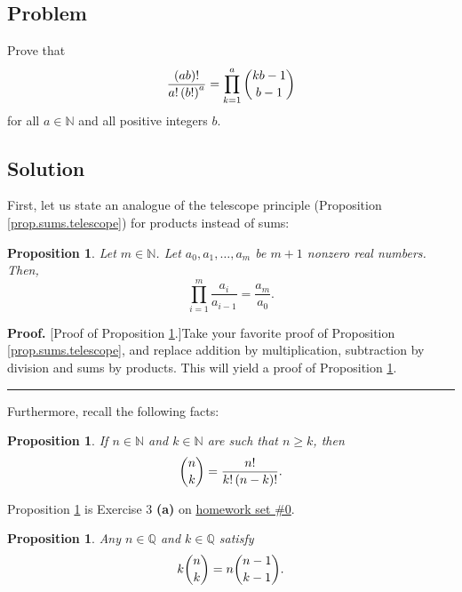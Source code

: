 \documentclass[paper=a4, fontsize=12pt]{scrartcl}%
\let\prodnonlimits\prod
\renewcommand{\prod}{\prodnonlimits\limits}
\theoremstyle{plainsl}
\newtheorem{proposition}[theorem]{Proposition}
\theoremstyle{definition}
\theoremstyle{remark}
\newenvironment{proof}[1][Proof]{\noindent\textbf{#1.} }{\ \rule{0.5em}{0.5em}}
\begin{document}
\subsection{Problem}

Prove that
\[
\dfrac{\left(  ab \right)  !}{a! \left(  b! \right)  ^{a}} = \prod_{k=1}^{a}
\dbinom{kb-1}{b-1}
\]
for all $a \in\mathbb{N}$ and all positive integers $b$.

\subsection{Solution}

First, let us state an analogue of the telescope principle (Proposition
\ref{prop.sums.telescope}) for products instead of sums:

\begin{proposition}
\label{prop.sums.telescope-prod}Let $m\in\mathbb{N}$. Let $a_{0},a_{1}%
,\ldots,a_{m}$ be $m+1$ nonzero real numbers. Then,
\[
\prod_{i=1}^{m}\dfrac{a_{i}}{a_{i-1}}=\dfrac{a_{m}}{a_{0}}.
\]

\end{proposition}

\begin{proof}
[Proof of Proposition \ref{prop.sums.telescope-prod}.]Take your favorite proof
of Proposition \ref{prop.sums.telescope}, and replace addition by
multiplication, subtraction by division and sums by products. This will yield
a proof of Proposition \ref{prop.sums.telescope-prod}.
\end{proof}

Furthermore, recall the following facts:

\begin{proposition}
\label{prop.sol.binom.102.fac-form}If $n\in\mathbb{N}$ and $k\in\mathbb{N}$
are such that $n\geq k$, then
\[
\dbinom{n}{k}=\dfrac{n!}{k!\left(  n-k\right)  !}.
\]

\end{proposition}

Proposition \ref{prop.sol.binom.102.fac-form} is Exercise 3 \textbf{(a)} on
\href{http://www.cip.ifi.lmu.de/~grinberg/t/19s/hw0s.pdf}{homework set \#0}.

\begin{proposition}
\label{prop.sol.binom.102.absorb}Any $n\in\mathbb{Q}$ and $k\in\mathbb{Q}$
satisfy
\[
k\dbinom{n}{k}=n\dbinom{n-1}{k-1}.
\]

\end{proposition}
\end{document}
